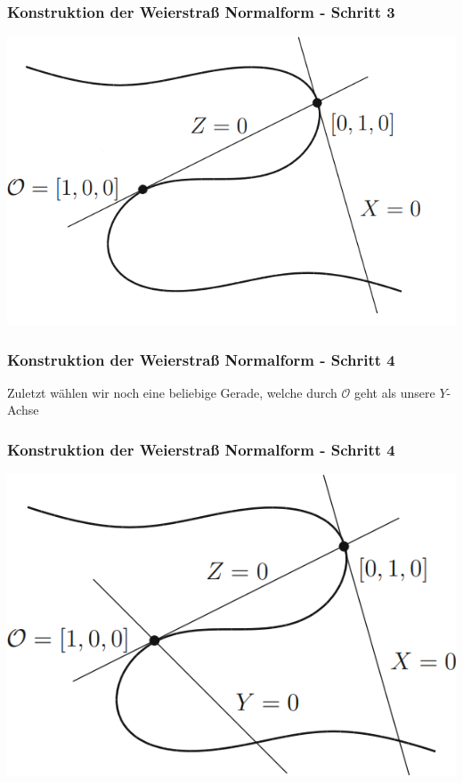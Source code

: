 \documentclass{beamer}
\begin{document}
\begin{frame}
\frametitle{Konstruktion der Weierstraß Normalform - Schritt 3}
    \begin{center}
    \includegraphics[scale=2]{images/WNF_Konstruktion_3.png}
    \end{center}
\end{frame}

\begin{frame}
\frametitle{Konstruktion der Weierstraß Normalform - Schritt 4}
	Zuletzt wählen wir noch eine beliebige Gerade, welche durch
	\(\mathcal{O}\) geht als unsere \(Y\)-Achse
\end{frame}

\begin{frame}
\frametitle{Konstruktion der Weierstraß Normalform - Schritt 4}
    \begin{center}
    \includegraphics[scale=2]{images/WNF_Konstruktion_4.png}
    \end{center}
\end{frame}
\end{document}
